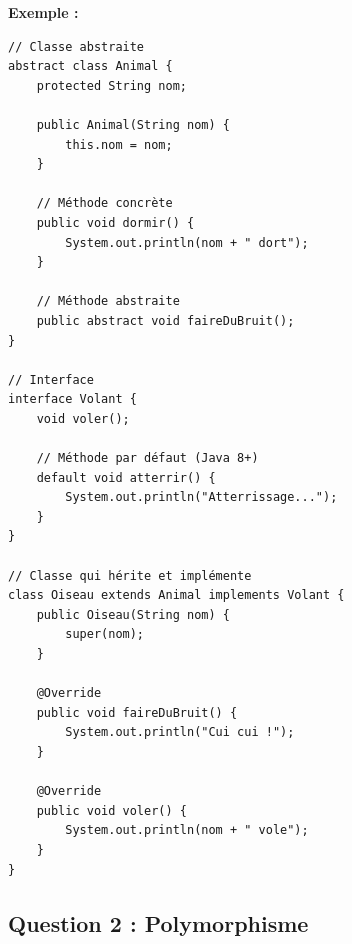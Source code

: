 \documentclass[11pt,a4paper]{article}
\begin{document}
\begin{correctionbox}
\textbf{Exemple :}

\begin{lstlisting}
// Classe abstraite
abstract class Animal {
    protected String nom;
    
    public Animal(String nom) {
        this.nom = nom;
    }
    
    // Méthode concrète
    public void dormir() {
        System.out.println(nom + " dort");
    }
    
    // Méthode abstraite
    public abstract void faireDuBruit();
}

// Interface
interface Volant {
    void voler();
    
    // Méthode par défaut (Java 8+)
    default void atterrir() {
        System.out.println("Atterrissage...");
    }
}

// Classe qui hérite et implémente
class Oiseau extends Animal implements Volant {
    public Oiseau(String nom) {
        super(nom);
    }
    
    @Override
    public void faireDuBruit() {
        System.out.println("Cui cui !");
    }
    
    @Override
    public void voler() {
        System.out.println(nom + " vole");
    }
}
\end{lstlisting}
\end{correctionbox}

\subsection{Question 2 : Polymorphisme}
\end{document}

